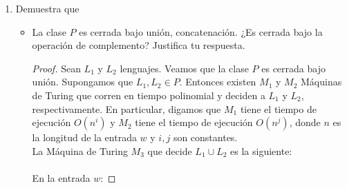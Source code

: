 \documentclass[letterpaper,10pt]{article}
\begin{document}
\begin{enumerate}
\begin{itemize}
\begin{proof}
             buscando el árbol de cálculo no determinista de $M$. En una 
             entrada de longitud $n$, cada rama del árbol de cómputo no
             determinista de $M$ el árbol tiene una longitud de a lo más
             $f(n)$. Cada nodo del árbol puede tener a lo más $k$ hijos,
             donde $k$ es el número máximo de opciones legales dadas
             por la función de transición de $M$. Por lo que, el número
             total de hojas en el árbol es a lo más $k^{f(n)}$. \\
             La simulación procede explorando primero la amplitud de este 
             árbol. En otras palabras, visita todos los nodos en profundidad
             $p$ antes de pasar a cualquiera de los nodos en profundidad
             $p + 1$. El algoritmo del teorema mencionado anteriormente
             comienza en la raíz y viaja hacia un nodo cada vez que visita
             ese nodo.  El número total de nodos en el árbol es menor que
             el doble del número máximo de hojas, por lo que lo
             limitamos por $O(k^{f(n)}$. El tiempo que se tarda en arrancar
             desde la raíz y viajar hasta un nodo es $O(f(n))$. Por lo tanto,
             el tiempo de ejecución de $M'$ es $O(f(n)k^{f(n)}) = O(2^{f(n)})$.
             
         \end{proof} 

     \end{itemize}
     
     \item Demuestra que
     
     \begin{itemize}
         
         \item La clase $P$ es cerrada bajo unión, concatenación. ¿Es cerrada
         bajo la operación de complemento? Justifica tu respuesta.
         
         \begin{proof}
             Sean $L_1$ y $L_2$ lenguajes. Veamos que la clase $P$ es cerrada
             bajo unión. Supongamos que $L_1, L_2 \in P$. Entonces existen
             $M_1$ y $M_2$ Máquinas de Turing que corren en tiempo 
             polinomial y deciden a $L_1$ y $L_2$, respectivamente. En
             particular, digamos que $M_1$ tiene el tiempo de ejecución
             $O(n^{i})$ y $M_2$ tiene el tiempo de ejecución $O(n^{j})$, donde
             $n$ es la longitud de la entrada $w$ y $i, j$ son constantes. \\
             La Máquina de Turing $M_3$ que decide $L_1 \cup L_2$ es la
             siguiente: \\ \\
             En la entrada $w$:
             

\end{proof}
\end{itemize}
\end{enumerate}
\end{document}
